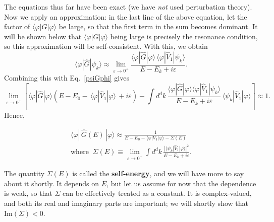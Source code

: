 \documentclass[pra,12pt]{revtex4}
\begin{document}
The equations thus far have been exact (we have \textit{not} used
perturbation theory).  Now we apply an approximation: in the last line
of the above equation, let the factor of
$\langle\varphi|G|\varphi\rangle$ be large, so that the first term in
the sum becomes dominant.  It will be shown below that
$\langle\varphi|G|\varphi\rangle$ being large is precisely the
resonance condition, so this approximation will be self-consistent.
With this, we obtain
\begin{equation}
  \langle\varphi|\hat{G}|\psi_k\rangle \approx \lim_{\varepsilon\rightarrow0^+} \frac{\langle\varphi|\hat{G}|\varphi\rangle \, \langle\varphi|\hat{V}_1|\psi_k\rangle}{E-E_k+i\varepsilon}.
\end{equation}
Combining this with Eq.~\eqref{psiGphi} gives
\begin{equation*}
  \lim_{\varepsilon\rightarrow0^+} \left[\langle\varphi|\hat{G}|\varphi\rangle \left(E - E_0 -\, \langle\varphi|\hat{V}_1|\varphi\rangle \, + i\varepsilon\right) - \int d^dk\, \frac{\langle\varphi|\hat{G}|\varphi\rangle\langle\varphi|\hat{V}_1|\psi_k\rangle}{E-E_k+i\varepsilon} \, \langle\psi_k| \hat{V}_1|\varphi\rangle\right] \approx 1.
\end{equation*}
Hence,
\begin{framed}
  \begin{equation}
    \begin{aligned}
      \langle\varphi|\,\hat{G}(E)\,|\varphi\rangle \approx \frac{1}{\displaystyle E - E_0 - \langle\varphi|V_1|\varphi\rangle - \Sigma(E)} \\
      \mathrm{where}\;\;\Sigma(E) \equiv \lim_{\varepsilon\rightarrow0^+} \int d^dk\, \frac{\displaystyle| \langle\psi_k| \hat{V}_1|\varphi\rangle|^2}{\displaystyle E-E_k+i\varepsilon}.
    \end{aligned}
    \label{phiGphi_result}
  \end{equation}
\end{framed}
\vskip -0.12in
The quantity $\Sigma(E)$ is called the \textbf{self-energy}, and we
will have more to say about it shortly.  It depends on $E$, but let us
assume for now that the dependence is weak, so that $\Sigma$ can be
effectively treated as a constant.  It is complex-valued, and both its
real and imaginary parts are important; we will shortly show that
$\mathrm{Im}(\Sigma) < 0$.
\end{document}
